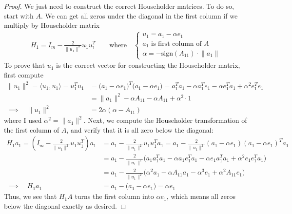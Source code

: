 \documentclass[12pt]{article}
\numberwithin{equation}{section} %
\theoremstyle{plain}
\theoremstyle{definition}
\theoremstyle{remark}
\begin{document}
\begin{proof}
We just need to construct the correct Householder matrices. To do so,
start with $A$.  We can get all zeros under the diagonal in the
first column if we multiply by Householder matrix
\begin{align*}
  H_1 = I_m - \frac{2}{\lVert u_1\lVert^2}u_1u_1^T
  \qquad \text{where}\quad
  \begin{cases}
    u_1 = a_1 -\alpha e_1 \\
    \text{$a_1$ is first column of $A$} \\
    \alpha = -\text{sign}(A_{11})\cdot \lVert a_1\rVert
  \end{cases}
\end{align*}
To prove that $u_1$ is the correct vector for constructing the Householder
matrix, first compute
\begin{align*}
  \lVert u_1\rVert^2
  =
  \langle u_1, u_1\rangle
  = u_1^T u_1
  &=
  \big(a_1 - \alpha e_1\big)^T
  \big(a_1 - \alpha e_1\big)
  =
  a_1^Ta_1 - \alpha a_1^Te_1 - \alpha e_1^Ta_1 +\alpha^2e_1^Te_1
  \\
  &=
  \lVert a_1\rVert^2
  - \alpha A_{11} - \alpha A_{11} +\alpha^2\cdot 1
  \\
  \implies\quad
  \lVert u_1\rVert^2
  &=
  2\alpha(\alpha- A_{11})
\end{align*}
where I used $\alpha^2 =\lVert a_1\rVert^2$.
Next, we compute the Householder transformation of the first column of
$A$, and verify that it is all zero below the diagonal:
\begin{align*}
  H_1a_1
  = \left(I_m - \frac{2}{\lVert u_1\rVert^2}u_1u_1^T\right)a_1
  &= a_1 - \frac{2}{\lVert u_1\rVert^2}u_1u_1^Ta_1
  = a_1
  - \frac{2}{\lVert u_1\rVert^2}(a_1-\alpha e_1)(a_1-\alpha e_1)^Ta_1
  \\
  &= a_1
    - \frac{2}{\lVert u_1\rVert^2}
    \big(
      a_1a_1^Ta_1 - \alpha a_1e_1^Ta_1 - \alpha e_1a_1^Ta_1
      + \alpha^2e_1e_1^Ta_1
    \big)
  \\
  &= a_1
    - \frac{2}{\lVert u_1\rVert^2}
    \big(
      \alpha^2a_1
      - \alpha A_{11}a_1
      -\alpha^3 e_1
      + \alpha^2A_{11}e_1
    \big)
  \\
  \implies\quad H_1a_1
  &= a_1
    -
    \big(
      a_1
      - \alpha e_1
    \big)
  =\alpha e_1
\end{align*}
Thus, we see that $H_1A$ turns the first column into $\alpha e_1$, which
means all zeros below the diagonal exactly as desired.


\end{proof}
\end{document}
